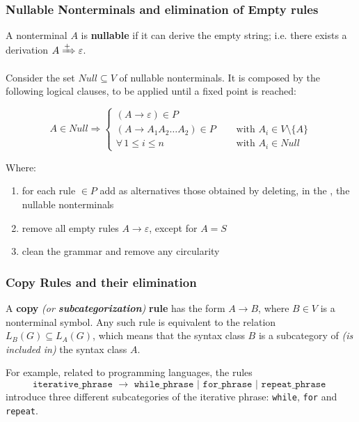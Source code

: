 \documentclass[english]{article}
\begin{document}
\subsubsection{Nullable Nonterminals and elimination of Empty rules}
\label{sec:nullable-nonterminals-and-elimination-of-empty-rules}

A nonterminal \(A\) is \textbf{nullable} if it can derive the empty string;
i.e. there exists a derivation \(A \xRightarrow{+} \varepsilon\).

Consider the set \(\textit{Null} \subseteq V\) of nullable nonterminals.
It is composed by the following logical clauses, to be applied until a fixed point is reached:

\[
  A \in \textit{Null} \Rightarrow
  \begin{cases}
    (A \rightarrow \varepsilon) \in P                                                        \\
    (A \rightarrow A_1 A_2 \ldots A_2) \in P \quad & \text{ with } A_i \in V \setminus \{A\} \\
    \forall \, 1 \leq i \leq n \quad               & \text{ with } A_i \in \textit{Null}
  \end{cases}
\]

Where:

\begin{enumerate}[label=row \arabic*), left=20pt]
  \item for each rule \(\in P\) add as alternatives those obtained by deleting, in the \RP, the nullable nonterminals
  \item remove all empty rules \(A \rightarrow \varepsilon\), except for \(A=S\)
  \item clean the grammar and remove any circularity
\end{enumerate}

\subsubsection{Copy Rules and their elimination}
\label{sec:copy-rules-and-their-elimination}

A \textbf{copy}\textit{ (or \textbf{subcategorization})} \textbf{rule} has the form \(A \rightarrow B\), where \(B \in V\) is a nonterminal symbol.
Any such rule is equivalent to the relation \(L_B(G) \subseteq L_A(G)\), which means that the syntax class \(B\) is a subcategory of \textit{(is included in)} the syntax class \(A\).

For example, related to programming languages, the rules
\[\texttt{iterative\_phrase } \rightarrow \texttt{ while\_phrase } | \texttt{ for\_phrase } | \texttt{ repeat\_phrase }\]
introduce three different subcategories of the iterative phrase: \texttt{while}, \texttt{for} and \texttt{repeat}.
\end{document}
